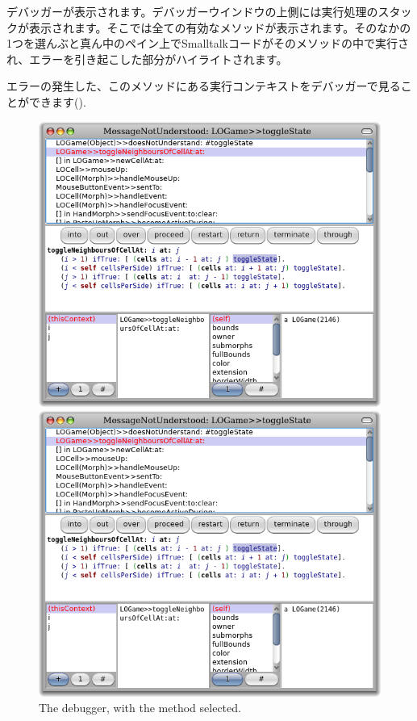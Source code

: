 \documentclass[a4paper,10pt,twoside]{book}
\begin{document}
デバッガーが表示されます。デバッガーウインドウの上側には実行処理のスタックが表示されます。そこでは全ての有効なメソッドが表示されます。そのなかの1つを選んぶと真ん中のペイン上でSmalltalkコードがそのメソッドの中で実行され、エラーを引き起こした部分がハイライトされます。

エラーの発生した、このメソッドにある実行コンテキストをデバッガーで見ることができます().

\begin{figure}[ht]
\ifluluelse
	{\centerline {\includegraphics[width=\textwidth]{Debugger}}}
	{\centerline {\includegraphics[scale=0.7]{Debugger}}}
\caption{The debugger, with the method   selected.
}
\end{figure}
\end{document}
